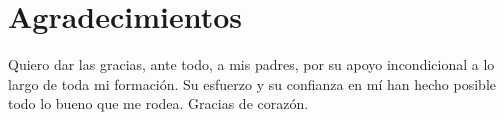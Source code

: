 \chapter{Agradecimientos}

Quiero dar las gracias, ante todo, a mis padres, por su apoyo incondicional
a lo largo de toda mi formación. Su esfuerzo y su confianza en mí han hecho 
posible todo lo bueno que me rodea. Gracias de corazón.
